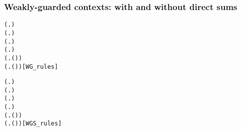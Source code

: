 \begin{frame}[fragile]
\frametitle{Weakly-guarded contexts: with and without direct sums}
\begin{alltt}
 (\HOLTokenLambda{}. )
  \HOLSymConst{\HOLTokenImp{}}  (\HOLTokenLambda{}.  )
  \HOLSymConst{\HOLTokenConj{}}   \HOLSymConst{\HOLTokenImp{}}  (\HOLTokenLambda{}.   \HOLSymConst{\ensuremath{+}}  )
  \HOLSymConst{\HOLTokenConj{}}   \HOLSymConst{\HOLTokenImp{}}  (\HOLTokenLambda{}.   \HOLSymConst{\ensuremath{\parallel}}  )
  \HOLSymConst{\HOLTokenImp{}}  (\HOLTokenLambda{}. \HOLSymConst{\ensuremath{\nu}}  ( ))
  \HOLSymConst{\HOLTokenImp{}}  (\HOLTokenLambda{}.  ( ) )\hfill{[WG_rules]}
\end{alltt}
\begin{alltt}
 (\HOLTokenLambda{}. )
  \HOLSymConst{\HOLTokenImp{}}  (\HOLTokenLambda{}.  )
  \HOLSymConst{\HOLTokenConj{}}   \HOLSymConst{\HOLTokenImp{}}  (\HOLTokenLambda{}.   \HOLSymConst{\ensuremath{+}}  )
  \HOLSymConst{\HOLTokenConj{}}   \HOLSymConst{\HOLTokenImp{}}  (\HOLTokenLambda{}.   \HOLSymConst{\ensuremath{\parallel}}  )
  \HOLSymConst{\HOLTokenImp{}}  (\HOLTokenLambda{}. \HOLSymConst{\ensuremath{\nu}}  ( ))
  \HOLSymConst{\HOLTokenImp{}}  (\HOLTokenLambda{}.  ( ) )\hfill{[WGS_rules]}
\end{alltt}
\end{frame}

